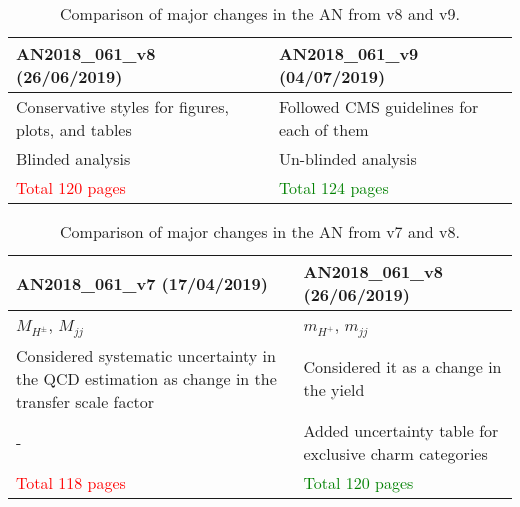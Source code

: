 \begin{table}
\centering
\caption*{Comparison of major changes in the AN from v8 and
v9.}
\begin{adjustbox}{max width=\textwidth}
\begin{tabular}{p{8cm}|p{8cm}}
\hline
{\bf{AN2018\_061\_v8 (26/06/2019) }} & {\bf{AN2018\_061\_v9 (04/07/2019) }}\\
\hline 
Conservative styles for figures, plots, and tables  & Followed CMS guidelines for each of them\\\hline 
Blinded analysis              & Un-blinded analysis\\\hline
\textcolor{red}{Total 120 pages}                 &\textcolor{green}{Total 124 pages}\\\hline
\end{tabular}
\end{adjustbox}
\end{table}

\begin{table}
\centering
\caption*{Comparison of major changes in the AN from v7 and
v8.}
\begin{adjustbox}{max width=\textwidth}
\begin{tabular}{p{8cm}|p{8cm}}
\hline
{\bf{AN2018\_061\_v7 (17/04/2019) }} & {\bf{AN2018\_061\_v8 (26/06/2019) }}\\
\hline 
$M_{H^\pm}$, $M_{jj}$           & $m_{H^+}$, $m_{jj}$ \\\hline 
Considered systematic uncertainty in the QCD estimation as change in the transfer 
scale factor & Considered it as a change in the yield \\\hline
-              & Added uncertainty table for exclusive charm categories\\\hline
\textcolor{red}{Total 118 pages}                 & \textcolor{green}{Total 120 pages}\\\hline
\end{tabular}
\end{adjustbox}
\end{table}

